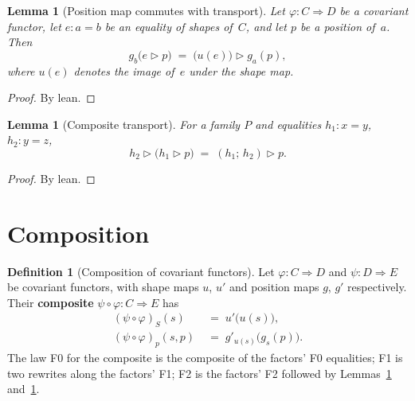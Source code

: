 \documentclass[11pt,a4paper]{article}
\theoremstyle{plain}
\newtheorem{lemma}[theorem]{Lemma}
\theoremstyle{definition}
\newtheorem{definition}[theorem]{Definition}
\begin{document}
\begin{lemma}[Position map commutes with transport]\label{lem:onpos-transport}
Let $\varphi : C \Rightarrow D$ be a covariant functor, let $e : a = b$ be an
equality of shapes of~$C$, and let $p$ be a position of~$a$. Then
\begin{equation}
  g_b\bigl(e \mathbin{\triangleright} p\bigr)
  \;=\;
  \bigl(u(e)\bigr) \mathbin{\triangleright} g_a(p),
\end{equation}
where $u(e)$ denotes the image of~$e$ under the shape map.
\end{lemma}

\begin{proof}
By lean.
\end{proof}

\begin{lemma}[Composite transport]\label{lem:transport-trans}
For a family $P$ and equalities $h_1 : x = y$, $h_2 : y = z$,
\begin{equation}
  h_2 \mathbin{\triangleright}
    \bigl(h_1 \mathbin{\triangleright} p\bigr)
  \;=\;
  (h_1 \mathbin{;}\, h_2) \mathbin{\triangleright} p.
\end{equation}
\end{lemma}

\begin{proof}
By lean.
\end{proof}

\section{Composition}

\begin{definition}[Composition of covariant functors]\label{def:comp}
Let $\varphi : C \Rightarrow D$ and $\psi : D \Rightarrow E$ be covariant
functors, with shape maps $u$, $u'$ and position maps $g$, $g'$ respectively.
Their \textbf{composite} $\psi \circ \varphi : C \Rightarrow E$ has
\begin{align}
  (\psi \circ \varphi)_S(s)
  &\;=\;
  u'\bigl(u(s)\bigr),
  \\[4pt]
  (\psi \circ \varphi)_p(s,p)
  &\;=\;
  g'_{u(s)}\bigl(g_s(p)\bigr).
\end{align}
The law F0 for the composite is the composite of the factors' F0 equalities;
F1 is two rewrites along the factors' F1; F2 is the factors' F2 followed by
Lemmas~\ref{lem:onpos-transport} and~\ref{lem:transport-trans}.
\end{definition}
\end{document}
